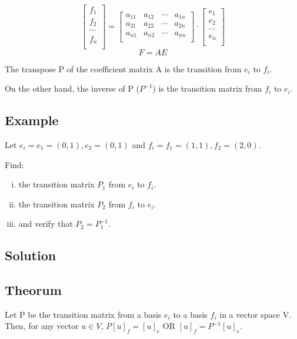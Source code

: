 \documentclass{book}
\begin{document}
\[\begin{bmatrix}
	f_1 \\
	f_2 \\
	\cdots \\
	f_n \\
\end{bmatrix}
=
\begin{bmatrix}
	a_{11} & a_{12} & \cdots & a_{1n} \\
	a_{21} & a_{22} & \cdots & a_{2n} \\
	a_{n1} & a_{n2} & \cdots & a_{nn} \\
\end{bmatrix}
\cdot
\begin{bmatrix}
	e_1 \\
	e_2 \\
	\cdots \\
	e_n \\
\end{bmatrix}\]
\[F = AE\]

The transpose P of the coefficient matrix A is the transition from \(e_i\) to \(f_i\).

On the other hand, the inverse of P (\(P^{-1}\)) is the transition matrix from \(f_i\) to \(e_i\).

\subsection{Example}

Let \({e_i} = {e_1 = (0, 1), e_2 = (0, 1)}\) and \({f_i} = {f_1 = (1, 1), f_2 = (2, 0)}\).

Find:

\begin{enumerate}[(i)]
	\item the transition matrix \(P_1\) from \({e_i}\) to \({f_i}\).
	\item the transition matrix \(P_2\) from \({f_i}\) to \({e_i}\).
	\item and verify that \(P_2 = P^{-1}_1\).
\end{enumerate}

\subsection*{Solution}

\subsection{Theorum}

Let P be the transition matrix from a basis \({e_i}\) to a basis \({f_i}\) in a vector space V. Then, for any vector \(u \in V\), \(P[u]_f = [u]_e\) OR \([u]_f = P^{-1}[u]_e\).
\end{document}
